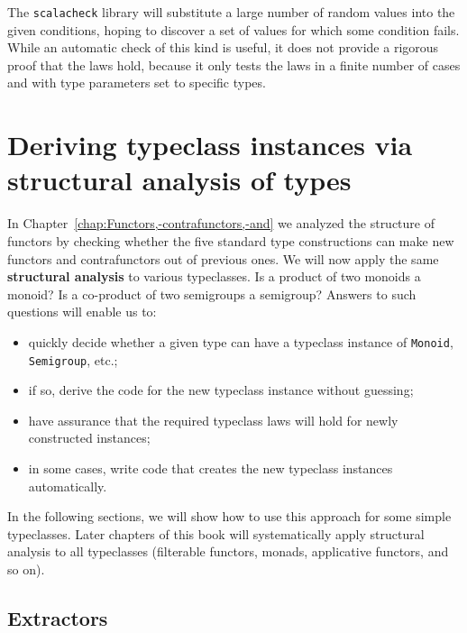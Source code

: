 The \texttt{scalacheck} library will substitute a large number of
random values into the given conditions, hoping to discover a set
of values for which some condition fails. While an automatic check
of this kind is useful, it does not provide a rigorous proof that
the laws hold, because it only tests the laws in a finite number of
cases and with type parameters set to specific types.

\section{Deriving typeclass instances via structural analysis of types}

In Chapter~\ref{chap:Functors,-contrafunctors,-and} we analyzed
the structure of functors by checking whether the five standard type
constructions can make new functors and contrafunctors out of previous
ones. We will now apply the same \textbf{structural
analysis} to various typeclasses. Is a product of two monoids a monoid?
Is a co-product of two semigroups a semigroup? Answers to such questions
will enable us to:
\begin{itemize}
\item quickly decide whether a given type can have a typeclass instance
of \lstinline!Monoid!, \lstinline!Semigroup!, etc.;
\item if so, derive the code for the new typeclass instance without guessing;
\item have assurance that the required typeclass laws will hold for newly
constructed instances;
\item in some cases, write code that creates the new typeclass instances
automatically.
\end{itemize}
In the following sections, we will show how to use this approach for
some simple typeclasses. Later chapters of this book will systematically
apply structural analysis to all typeclasses (filterable functors,
monads, applicative functors, and so on).

\subsection{Extractors}


